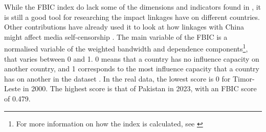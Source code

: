 While the FBIC index do lack some of the dimensions and indicators found in \citet{levitsky_linkage_2006}, it is still a good tool for researching the impact linkages have on different countries. Other contributions have already used it to look at how linkages with China might affect media self-censorship \citep{toettoe_foreign_2023}. The main variable of the FBIC is a normalised variable of the weighted bandwidth and dependence components\footnote{For more information on how the index is calculated, see \citet[pp. 26-31]{moyer_china-us_2021}}, that varies between 0 and 1. 0 means that a country has no influence capacity on another country, and 1 corresponds to the most influence capacity that a country has on another in the dataset \citep[p. 28]{moyer_china-us_2021}. In the real data, the lowest score is 0 for Timor-Leste in 2000. The highest score is that of Pakistan in 2023, with an FBIC score of 0.479. 

\begin{table}[H]
\centering
\caption{Components of the FBIC index}
\label{tab:fbic}
\vspace{0.5em}
\end{table}

